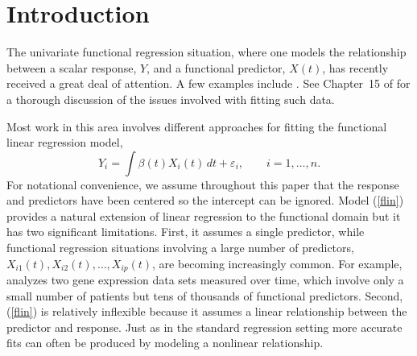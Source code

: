 \documentclass[aos,MSNbibl,dvips]{arximspdf}
\begin{document}
\section{Introduction}
The univariate functional regression situation, where one models the
relationship between a scalar response, $Y$, and a functional predictor,
$X(t)$, has recently received a great deal of attention. A few examples
include \cite{hastie7,hall1,alter1,hall2,james3,cardot1,ferraty2,james5,muller1,ferraty3,chen2}. See Chapter~15 of \cite{Bramsay3} for a thorough
discussion of the issues involved with fitting such data.

Most
work in this area involves different approaches for fitting the functional
linear regression model,
%
\begin{equation}
\label{flin} Y_i = \int\beta(t) X_i(t) \,dt +
\varepsilon_i, \qquad i = 1,\ldots, n.
\end{equation}
%
For notational convenience, we assume throughout this paper that the
response and predictors have been centered so the intercept can be
ignored. Model (\ref{flin}) provides a natural extension of linear
regression to
the functional domain but it has two significant limitations. First,
it assumes a single predictor, while functional regression situations
involving a large number of predictors, $X_{i1}(t), X_{i2}(t), \ldots,
X_{ip}(t)$, are becoming increasingly common. For example, \cite{storey1}
analyzes two gene expression data sets measured over time, which
involve only a small number of patients but tens of thousands of
functional predictors. Second, (\ref{flin}) is relatively inflexible
because it assumes a
linear relationship between the predictor and response. Just as in the
standard regression setting more accurate fits can often be produced by
modeling a nonlinear relationship.
\end{document}
